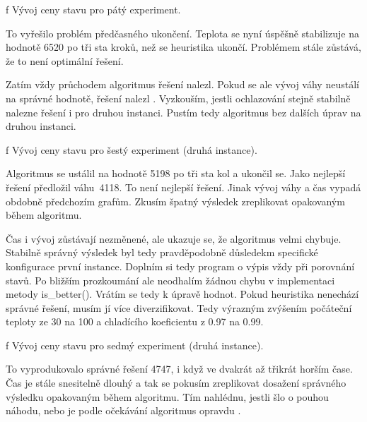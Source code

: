 \centerline{ \picwidth=14cm  }
\caption/f Vývoj ceny stavu pro pátý experiment.
\bigskip

To vyřešilo problém předčasného ukončení. Teplota se nyní úspěšně stabilizuje na hodnotě 6520 po tři sta kroků, než se heuristika ukončí. Problémem stále zůstává, že to není optimální řešení.

Zatím vždy průchodem algoritmus řešení nalezl. Pokud se ale vývoj váhy neustálí na správné hodnotě, řešení nalezl . Vyzkouším, jestli ochlazování stejně stabilně nalezne řešení i pro druhou instanci. Pustím tedy algoritmus bez dalších úprav na druhou instanci.

\centerline{ \picwidth=15cm  }
\caption/f Vývoj ceny stavu pro šestý experiment (druhá instance).
\bigskip

Algoritmus se ustálil na hodnotě 5198 po tři sta kol a ukončil se. Jako nejlepší řešení předložil váhu~4118. To není nejlepší řešení. Jinak vývoj váhy a čas vypadá obdobně předchozím grafům. Zkusím špatný výsledek zreplikovat opakovaným během algoritmu.

\bigskip
\centerline{}\bigskip

Čas i vývoj zůstávají nezměnené, ale ukazuje se, že algoritmus velmi chybuje. Stabilně správný výsledek byl tedy pravděpodobně důsledekm specifické konfigurace první instance. Doplním si tedy program o výpis vždy při porovnání stavů. Po bližším prozkoumání ale neodhalím žádnou chybu v implementaci metody is\_better(). Vrátím se tedy k úpravě hodnot. Pokud heuristika nenechází správné řešení, musím jí více diverzifikovat. Tedy výrazným zvýšením počáteční teploty ze 30 na 100 a chladícího koeficientu z 0.97 na 0.99.

\vfill\break

\centerline{ \picwidth=15cm  }
\caption/f Vývoj ceny stavu pro sedmý experiment (druhá instance).
\bigskip

To vyprodukovalo správné řešení 4747, i když ve dvakrát až třikrát horším čase. Čas je stále snesitelně dlouhý a tak se pokusím zreplikovat dosažení správného výsledku opakovaným během algoritmu. Tím nahlédnu, jestli šlo o pouhou náhodu, nebo je podle očekávání algoritmus opravdu .

\bigskip
\centerline{}\bigskip

